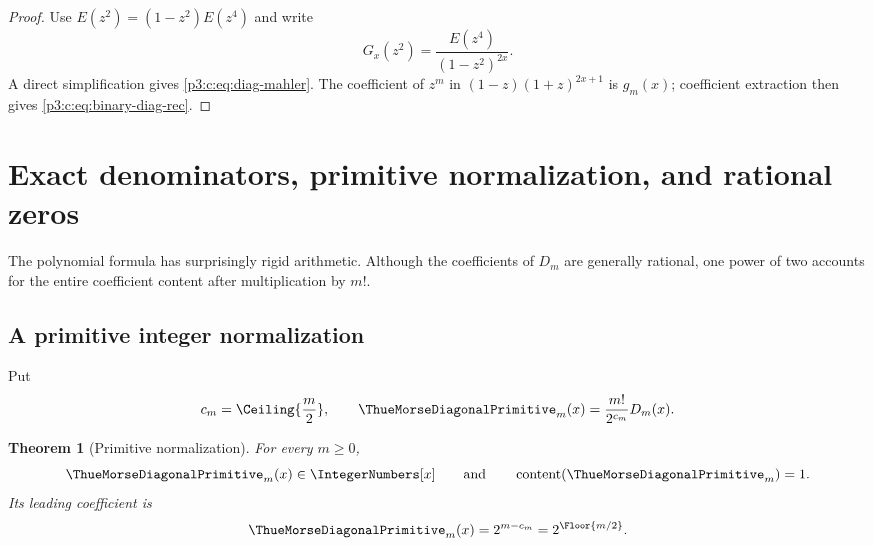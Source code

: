 \documentclass[11pt,oneside]{article}
\numberwithin{equation}{section}
\newtheorem{theorem}{Theorem}[section]
\theoremstyle{definition}
\theoremstyle{remark}
\begin{document}
\begin{proof}
Use \(E(z^2)=(1-z^2)E(z^4)\) and write
\[
 G_x(z^2)=\frac{E(z^4)}{(1-z^2)^{2x}}.
\]
A direct simplification gives \cref{p3:c:eq:diag-mahler}.  The coefficient of
\(z^m\) in \((1-z)(1+z)^{2x+1}\) is \(g_m(x)\); coefficient extraction
then gives \cref{p3:c:eq:binary-diag-rec}.
\end{proof}
\section{Exact denominators, primitive normalization, and rational zeros}
\label{p3:b:sec:arithmetic}\label{p3:ch:arithmetic}

The polynomial formula has surprisingly rigid arithmetic.  Although the
coefficients of $D_m$ are generally rational, one power of two accounts
for the entire coefficient content after multiplication by $m!$.

\subsection{A primitive integer normalization}

Put
\begin{equation}
 c_m=\Ceiling{\frac m2},
 \qquad
 \ThueMorseDiagonalPrimitive_m(x)=\frac{m!}{2^{c_m}}D_m(x).
 \label{p3:b:eq:Qm}
\end{equation}

\begin{theorem}[Primitive normalization]
\label{p3:b:thm:primitive}
For every $m\ge0$,
\begin{equation}
 \ThueMorseDiagonalPrimitive_m(x)\in\IntegerNumbers[x]
 \qquad\text{and}\qquad
 \operatorname{content}(\ThueMorseDiagonalPrimitive_m)=1.
 \label{p3:b:eq:primitive}
\end{equation}
Its leading coefficient is
\begin{equation}
 [x^m]\ThueMorseDiagonalPrimitive_m(x)=2^{m-c_m}=2^{\Floor{m/2}}.
 \label{p3:b:eq:Q-leading}
\end{equation}
\end{theorem}
\end{document}
